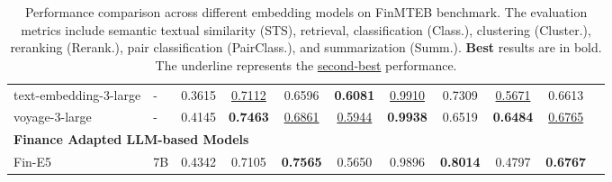 \begin{table*}[htbp]
{\begin{tabular}{llccccccccc}
text-embedding-3-large & - & 0.3615 & \underline{0.7112} & 0.6596 & \textbf{0.6081} & \underline{0.9910} & 0.7309 & \underline{0.5671} & 0.6613 \\
voyage-3-large & - & 0.4145 & \textbf{0.7463} & \underline{0.6861} & \underline{0.5944} & \textbf{0.9938} & 0.6519 & \textbf{0.6484} & \underline{0.6765}\\
\hline
\multicolumn{9}{l}{\textbf{Finance Adapted LLM-based Models}} \\
\hline
Fin-E5 & 7B & 0.4342 & 0.7105 & \textbf{0.7565} & 0.5650 & 0.9896 & \textbf{0.8014} & 0.4797 & \textbf{0.6767} \\
\bottomrule
\end{tabular}
}
\caption{Performance comparison across different embedding models on FinMTEB benchmark. The evaluation metrics include semantic textual similarity (STS), retrieval, classification (Class.), clustering (Cluster.), reranking (Rerank.), pair classification (PairClass.), and summarization (Summ.). \textbf{Best} results are in bold. The underline represents the \underline{second-best} performance.}
\label{tab:benchmark}
\end{table*}